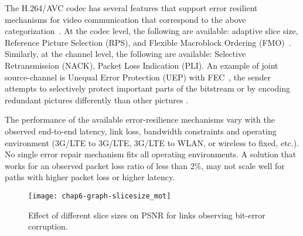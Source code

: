 The H.264/AVC codec has several features that support error resilient
mechanisms for video communication that correspond to the above
categorization~\cite{310669}. At the codec level, the following are available:
adaptive slice size, Reference Picture Selection (RPS), and Flexible
Macroblock Ordering (FMO)~\cite{err_res_h264_std, wenger_ott_jscc}. Similarly,
at the channel level, the following are available: Selective Retransmission
(NACK), Packet Loss Indication (PLI). An example of joint source-channel is
Unequal Error Protection (UEP) with FEC~\cite{wang00review}, the sender
attempts to selectively protect important parts of the bitstream or by
encoding redundant pictures differently than other pictures \cite{ervcuupkp}.

The performance of the available error-resilience mechanisms vary with the
observed end-to-end latency, link loss, bandwidth constraints and operating
environment (3G/LTE to 3G/LTE, 3G/LTE to WLAN, or wireless to fixed, etc.). No
single error repair mechanism fits all operating environments. A solution that
works for an observed packet loss ratio of less than 2\%, may not scale well
for paths with higher packet loss or higher latency.


\begin{figure}
\centerline {
\texttt{[image: chap6-graph-slicesize\_mot]}
}
\caption{Effect of different slice sizes on PSNR for links observing bit-error
corruption.}
\label{fig:slicesize_mot}
\end{figure}

